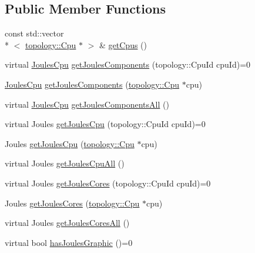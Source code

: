 \subsection*{Public Member Functions}
\begin{DoxyCompactItemize}
\item 
const std\-::vector\\*
$<$ \hyperlink{classmammut_1_1topology_1_1Cpu}{topology\-::\-Cpu} $\ast$ $>$ \& \hyperlink{classmammut_1_1energy_1_1CounterCpus_a25dbf6940e615a3662cbe10292ad7eaa}{get\-Cpus} ()
\item 
virtual \hyperlink{classmammut_1_1energy_1_1JoulesCpu}{Joules\-Cpu} \hyperlink{classmammut_1_1energy_1_1CounterCpus_a4324fc4985dc89228450436db46551b7}{get\-Joules\-Components} (topology\-::\-Cpu\-Id cpu\-Id)=0
\item 
\hyperlink{classmammut_1_1energy_1_1JoulesCpu}{Joules\-Cpu} \hyperlink{classmammut_1_1energy_1_1CounterCpus_aab977b563a941bd8e3c3bec601843566}{get\-Joules\-Components} (\hyperlink{classmammut_1_1topology_1_1Cpu}{topology\-::\-Cpu} $\ast$cpu)
\item 
virtual \hyperlink{classmammut_1_1energy_1_1JoulesCpu}{Joules\-Cpu} \hyperlink{classmammut_1_1energy_1_1CounterCpus_ad4c4327b501f7dcdbf2a8cf644bb3544}{get\-Joules\-Components\-All} ()
\item 
virtual Joules \hyperlink{classmammut_1_1energy_1_1CounterCpus_a80c1f90abccce3f3ab621f08f7141f78}{get\-Joules\-Cpu} (topology\-::\-Cpu\-Id cpu\-Id)=0
\item 
Joules \hyperlink{classmammut_1_1energy_1_1CounterCpus_a7f975349ac8b667abc61e60aaae495a3}{get\-Joules\-Cpu} (\hyperlink{classmammut_1_1topology_1_1Cpu}{topology\-::\-Cpu} $\ast$cpu)
\item 
virtual Joules \hyperlink{classmammut_1_1energy_1_1CounterCpus_a4e4ab2e96f0f9c48d0314dcbb5f4b0a2}{get\-Joules\-Cpu\-All} ()
\item 
virtual Joules \hyperlink{classmammut_1_1energy_1_1CounterCpus_a2c041bbe181f593a50490a53a2729989}{get\-Joules\-Cores} (topology\-::\-Cpu\-Id cpu\-Id)=0
\item 
Joules \hyperlink{classmammut_1_1energy_1_1CounterCpus_ae98a6650a69fb20ed2004156eb78f4d9}{get\-Joules\-Cores} (\hyperlink{classmammut_1_1topology_1_1Cpu}{topology\-::\-Cpu} $\ast$cpu)
\item 
virtual Joules \hyperlink{classmammut_1_1energy_1_1CounterCpus_a05c7df2da523e083fa1417c0df6dfe57}{get\-Joules\-Cores\-All} ()
\item 
virtual bool \hyperlink{classmammut_1_1energy_1_1CounterCpus_a94de30741049ba2131bcac532b8e7c8e}{has\-Joules\-Graphic} ()=0

\end{DoxyCompactItemize}

